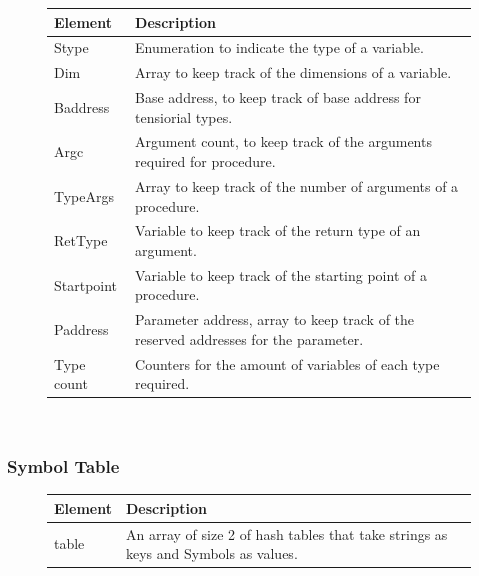 \begin{figure}[H]
    \centering
    \begin{tabular}{p{1in}p{3in}}
        \toprule
        \textbf{Element} & \textbf{Description}\\
        \midrule Stype &
        Enumeration to indicate the type of a variable.\\

        \midrule Dim &
        Array to keep track of the dimensions of a variable.\\

        \midrule Baddress &
        Base address, to keep track of base address for tensiorial types.\\

        \midrule Argc &
        Argument count, to keep track of the arguments required for procedure.\\

        \midrule TypeArgs &
        Array to keep track of the number of arguments of a procedure.\\

        \midrule RetType &
        Variable to keep track of the return type of an argument.\\

        \midrule Startpoint &
        Variable to keep track of the starting point of a procedure.\\

        \midrule Paddress &
        Parameter address, array to keep track of the reserved addresses for
        the parameter.\\

        \midrule Type count &
        Counters for the amount of variables of each type required.\\

        \bottomrule
    \end{tabular}\\
\end{figure}

\subsubsection{Symbol Table}

\begin{figure}[H]
    \centering
    \begin{tabular}{p{1in}p{3in}}
        \toprule
        \textbf{Element} & \textbf{Description}\\
        \midrule table &
        An array of size 2 of hash tables that take strings as keys and Symbols
        as values.\\

        \bottomrule
    \end{tabular}\\
\end{figure}

